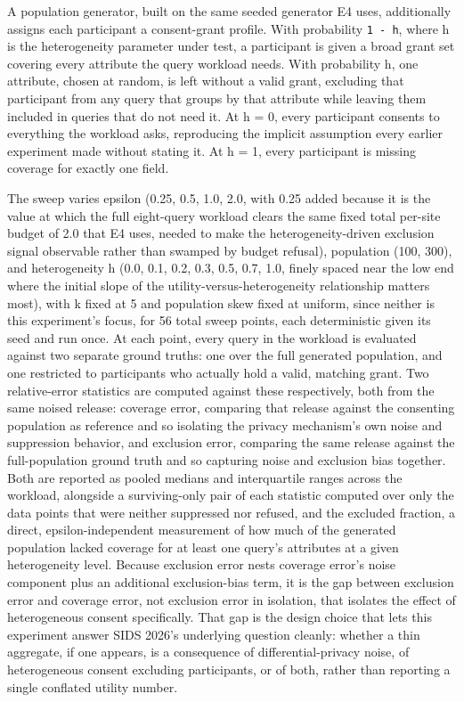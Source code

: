 A population generator, built on the same seeded generator E4 uses, additionally assigns each participant a consent-grant profile. With probability \texttt{1 - h}, where h is the heterogeneity parameter under test, a participant is given a broad grant set covering every attribute the query workload needs. With probability h, one attribute, chosen at random, is left without a valid grant, excluding that participant from any query that groups by that attribute while leaving them included in queries that do not need it. At h = 0, every participant consents to everything the workload asks, reproducing the implicit assumption every earlier experiment made without stating it. At h = 1, every participant is missing coverage for exactly one field.

The sweep varies epsilon (0.25, 0.5, 1.0, 2.0, with 0.25 added because it is the value at which the full eight-query workload clears the same fixed total per-site budget of 2.0 that E4 uses, needed to make the heterogeneity-driven exclusion signal observable rather than swamped by budget refusal), population (100, 300), and heterogeneity h (0.0, 0.1, 0.2, 0.3, 0.5, 0.7, 1.0, finely spaced near the low end where the initial slope of the utility-versus-heterogeneity relationship matters most), with k fixed at 5 and population skew fixed at uniform, since neither is this experiment's focus, for 56 total sweep points, each deterministic given its seed and run once. At each point, every query in the workload is evaluated against two separate ground truths: one over the full generated population, and one restricted to participants who actually hold a valid, matching grant. Two relative-error statistics are computed against these respectively, both from the same noised release: coverage error, comparing that release against the consenting population as reference and so isolating the privacy mechanism's own noise and suppression behavior, and exclusion error, comparing the same release against the full-population ground truth and so capturing noise and exclusion bias together. Both are reported as pooled medians and interquartile ranges across the workload, alongside a surviving-only pair of each statistic computed over only the data points that were neither suppressed nor refused, and the excluded fraction, a direct, epsilon-independent measurement of how much of the generated population lacked coverage for at least one query's attributes at a given heterogeneity level. Because exclusion error nests coverage error's noise component plus an additional exclusion-bias term, it is the gap between exclusion error and coverage error, not exclusion error in isolation, that isolates the effect of heterogeneous consent specifically. That gap is the design choice that lets this experiment answer SIDS 2026's underlying question cleanly: whether a thin aggregate, if one appears, is a consequence of differential-privacy noise, of heterogeneous consent excluding participants, or of both, rather than reporting a single conflated utility number.

